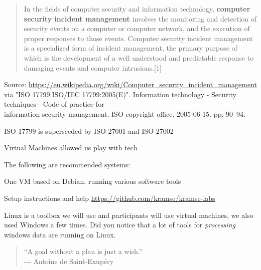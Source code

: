 \documentclass[Screen16to9,17pt]{foils}
\begin{document}


\begin{quote}
In the fields of computer security and information technology, {\bf computer security incident management} involves the monitoring and detection of security events on a computer or computer network, and the execution of proper responses to those events. Computer security incident management is a specialized form of incident management, the primary purpose of which is the development of a well understood and predictable response to damaging events and computer intrusions.[1]
\end{quote}
Source: \url{https://en.wikipedia.org/wiki/Computer_security_incident_management} \\
via "ISO 17799|ISO/IEC 17799:2005(E)". Information technology - Security techniques - Code of practice for\\ information security management. ISO copyright office. 2005-06-15. pp. 90–94.

\begin{list2}
\item ISO 17799 is superseeded by ISO 27001 and ISO 27002
\end{list2}




Virtual Machines allowed us play with tech

The following are recommended systems:
\begin{list2}
\item One VM based on Debian, running various software tools
\item Setup instructions and help \url{https://github.com/kramse/kramse-labs}
\end{list2}

Linux is a toolbox we will use and participants will use virtual machines, we also used Windows a few times. Did you notice that a lot of tools for \emph{processing} windows data are running on Linux.



\begin{quote}
  “A goal without a plan is just a wish.”\\
  ― Antoine de Saint-Exupéry
\end{quote}
\end{document}
